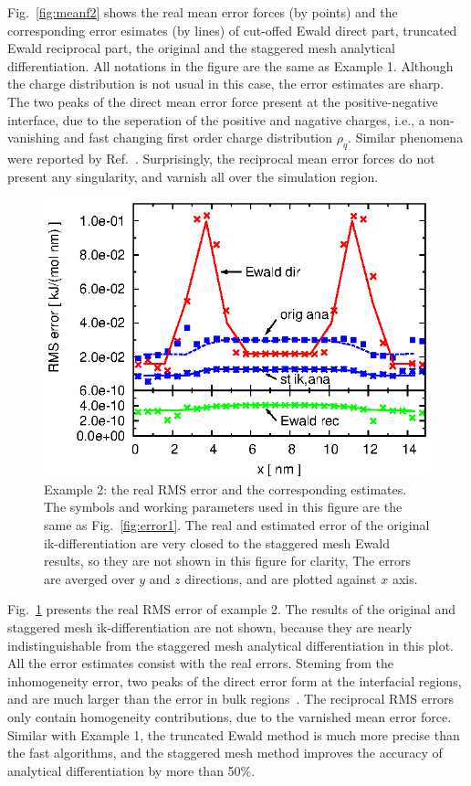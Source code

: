 \documentclass[aps,pre,preprint]{revtex4}
\begin{document}
Fig.~\ref{fig:meanf2} shows the real mean error forces (by points) and the
corresponding error esimates (by lines) of cut-offed Ewald direct
part, truncated Ewald reciprocal part, the original
and the staggered mesh analytical differentiation. All
notations in the figure are the same as Example 1.  Although the
charge distribution is not usual in this case, the error estimates are
sharp. The two peaks of the direct mean  error force present at the
positive-negative interface, due to the seperation of the positive
and nagative charges, i.e., a non-vanishing and fast changing first order charge
distribution $\rho_q$.  Similar phenomena were reported by
Ref.~\cite{wang2012}. Surprisingly, 
the reciprocal mean error forces
do not present any singularity, and varnish
all over the simulation region.

\begin{figure}
  \centering
  \includegraphics[]{fig.new/fig.rand2.error.eps}
  \caption{
    Example 2: the real RMS error and the corresponding
    estimates.
    The symbols and working parameters used in this figure are the same as
    Fig.~\ref{fig:error1}.
    The real and estimated error of the original ik-differentiation
    are very closed to the staggered mesh Ewald results, so
    they are not shown in this figure for clarity, 
    The errors are averged over $y$ and $z$ directions, and are
    plotted against $x$ axis.
  }
  \label{fig:error2}
\end{figure}

Fig.~\ref{fig:error2} presents the real RMS error of example 2. The
results of the original and staggered mesh ik-differentiation are not
shown, because they are nearly indistinguishable from the staggered
mesh analytical differentiation in this plot.
All the error estimates consist with the real errors.
Steming from the inhomogeneity error,
two peaks of the direct error form at the interfacial
regions, and are much larger than the error in bulk
regions~\cite{wang2012}.
The reciprocal RMS errors only contain homogeneity contributions,
due to the varnished mean error force.
Similar with Example 1, the truncated Ewald
method is much more precise than the fast algorithms, and the
staggered mesh method improves the accuracy of analytical
differentiation by more than 50\%.
\end{document}
